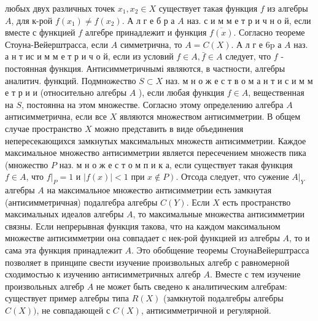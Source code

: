 \documentclass[10pt]{article}
\begin{document}
любых двух различных точек $x_{1}, x_{2} \in X$ существует такая функция $f$ из алгебры $A$, для к-рой $f\left(x_{1}\right) \neq f\left(x_{2}\right)$. А л г е б р а $A$ наз. с и м м е т р и ч н о й, если вместе с функцией $f$ алгебре принадлежит и функция $\overline{f(x)}$. Согласно теореме Стоуна-Вейерштрасса, если $A$ симметрична, то $A=C(X)$. А л г е $6 \mathrm{p}$ а $A$ наз. а н т ис и м м е т р и ч о й, если из условий $f \in A, \bar{f} \in A$ следует, что $f$ - постоянная функция. Антисимметричнымі являются, в частности, алгебры аналитич. функций. Подмножество $S \subset X$ наз. м н о ж е с т в о м а н т и с и м м е т р и и (относительно алгебры $A$ ), если любая функция $f \in A$, вещественная на $S$, постоянна на этом множестве. Согласно этому определению алгебра $A$ антисимметрична, если все $X$ являются множеством антисимметрии. В общем случае пространство $X$ можно представить в виде объединения непересекающихся замкнутых максимальных множеств антисимметрии. Каждое максимальное множество антисимметрии является пересечением множеств пика (множество $P$ наз. м н о ж е с т о м п и к а, если существует такая функция $f \in A$, что $\left.f\right|_{P}=1$ и $|f(x)|<1$ при $\left.x \notin P\right)$. Отсода следует, что сужение $\left.A\right|_{Y}$ алгебры $A$ на максимальное множество антисимметрии есть замкнутая (антисимметричная) подалгебра алгебры $C(Y)$. Если $X$ есть пространство максимальных идеалов алгебры $A$, то максимальные множества антисимметрии связны. Если непрерывная функция такова, что на каждом максимальном множестве антисимметрии она совпадает с нек-рой функцией из алгебры $A$, то и сама эта функция принадлежит $A$. Это обобщение теоремы СтоунаВейерштрасса позволяет в принципе свести изучение произвольных алгебр с равномерной сходимостью к изучению антисимметричных алгебр $A$. Вместе с тем изучение произвольных алгебр $A$ не может быть сведено к аналитическим алгебрам: существует пример алгебры типа $R(X)$ (замкнутой подалгебры алгебры $C(X))$, не совпадающей с $C(X)$, антисимметричной и регулярной.
\end{document}
